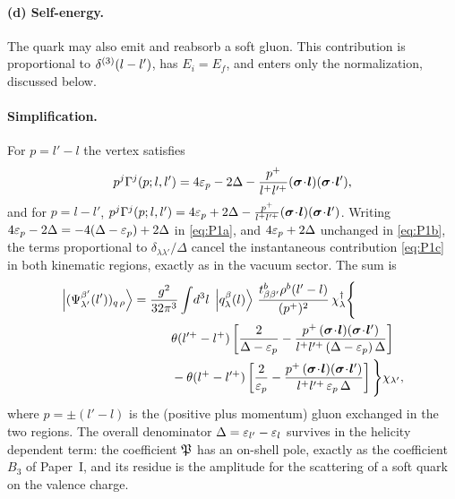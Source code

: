 \paragraph{(d) Self-energy.} The quark may also emit and reabsorb a soft gluon. This contribution
is proportional to $\delta^{(3)}(l-l')$, has $E_{i}=E_{f}$, and enters only the normalization,
discussed below.

\paragraph{Simplification.} For $p=l'-l$ the vertex satisfies
\begin{equation}
p^{j}\Gamma^{j}(p;l,l')=4\varepsilon_{p}-2\Delta-\frac{p^{+}}{l^{+}l'^{+}}(\bm\sigma\!\cdot\!\bm l)(\bm\sigma\!\cdot\!\bm l'),
\label{eq:pGam1}
\end{equation}
and for $p=l-l'$, $p^{j}\Gamma^{j}(p;l,l')=4\varepsilon_{p}+2\Delta-\tfrac{p^{+}}{l^{+}l'^{+}}(\bm\sigma\!\cdot\!\bm l)(\bm\sigma\!\cdot\!\bm l')$.
Writing $4\varepsilon_{p}-2\Delta=-4(\Delta-\varepsilon_{p})+2\Delta$ in \eqref{eq:P1a}, and
$4\varepsilon_{p}+2\Delta$ unchanged in \eqref{eq:P1b}, the terms proportional to
$\delta_{\lambda\lambda'}/\Delta$ cancel the instantaneous contribution \eqref{eq:P1c} in both
kinematic regions, exactly as in the vacuum sector. The sum is
\begin{align}
\ket{(\Psi^{\beta'}_{\lambda'}(l'))_{q\,\rho}}=\;&\frac{g^{2}}{32\pi^{3}}\int\!d^{3}l\;\ket{\qk{\beta}{\lambda}{l}}\,
\frac{t^{b}_{\beta\beta'}\rho^{b}(l'-l)}{(p^{+})^{2}}\,\chi^{\dg}_{\lambda}\Bigg\{
\nonumber\\&\hspace{0.6cm}
\theta(l'^{+}-l^{+})\left[\frac{2}{\Delta-\eps_{p}}
-\frac{p^{+}\,(\bm\sigma\!\cdot\!\bm l)(\bm\sigma\!\cdot\!\bm l')}{l^{+}l'^{+}\,(\Delta-\eps_{p})\,\Delta}\right]
\nonumber\\
&\hspace{0.6cm}-\theta(l^{+}-l'^{+})\left[\frac{2}{\eps_{p}}
-\frac{p^{+}\,(\bm\sigma\!\cdot\!\bm l)(\bm\sigma\!\cdot\!\bm l')}{l^{+}l'^{+}\,\eps_{p}\,\Delta}\right]\Bigg\}\chi_{\lambda'},
\label{eq:Pq-q}
\end{align}
where $p=\pm(l'-l)$ is the (positive plus momentum) gluon exchanged in the two regions. The
overall denominator $\Delta=\varepsilon_{l'}-\varepsilon_{l}$ survives in the helicity dependent term: the
coefficient $\mathfrak{P}$ has an on-shell pole, exactly as the coefficient $B_{3}$ of Paper~I, and its
residue is the amplitude for the scattering of a soft quark on the valence charge.

